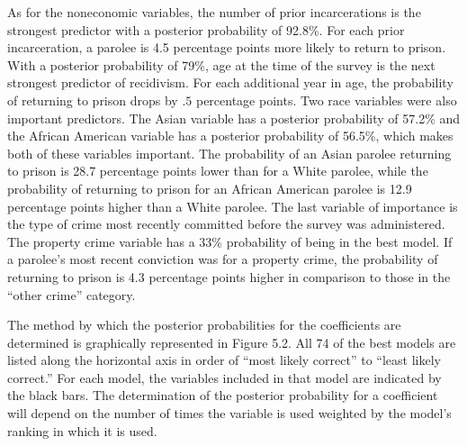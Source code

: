 As for the noneconomic variables, the number of prior incarcerations is the strongest predictor with a posterior probability of 92.8\%.  For each prior incarceration, a parolee is 4.5 percentage points more likely to return to prison.  With a posterior probability of 79\%, age at the time of the survey is the next strongest predictor of recidivism.  For each additional year in age, the probability of returning to prison drops by $.5$ percentage points.  Two race variables were also important predictors.  The Asian variable has a posterior probability of 57.2\% and the African American variable has a posterior probability of 56.5\%, which makes both of these variables important.  The probability of an Asian parolee returning to prison is 28.7 percentage points lower than for a White parolee, while the probability of returning to prison for an African American parolee is 12.9 percentage points higher than a White parolee.  The last variable of importance is the type of crime most recently committed before the survey was administered.  The property crime variable has a 33\% probability of being in the best model.  If a parolee's most recent conviction was for a property crime, the probability of returning to prison is 4.3 percentage points higher in comparison to those in the ``other crime'' category.

The method by which the posterior probabilities for the coefficients are determined is graphically represented in Figure 5.2.  All 74 of the best models are listed along the horizontal axis in order of ``most likely correct'' to ``least likely correct.''  For each model, the variables included in that model are indicated by the black bars.  The determination of the posterior probability for a coefficient will depend on the number of times the variable is used  weighted by the model's ranking in which it is used.


